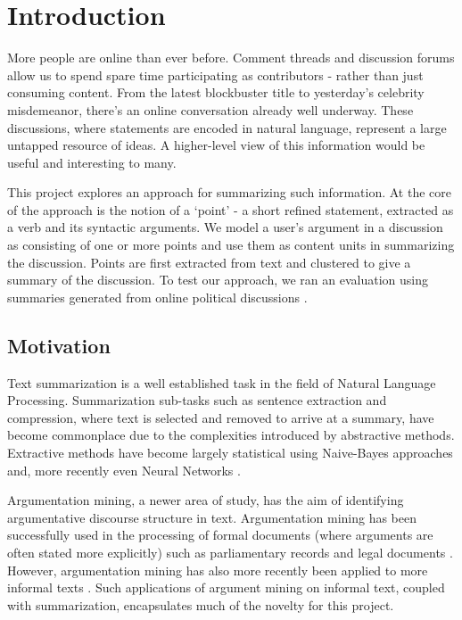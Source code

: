 \chapter{Introduction\label{chap:introduction}}
  More people are online than ever before. Comment threads and discussion forums allow us to spend spare time participating as contributors - rather than just consuming content. From the latest blockbuster title to yesterday's celebrity misdemeanor, there's an online conversation already well underway. These discussions, where statements are encoded in natural language, represent a large untapped resource of ideas. A higher-level view of this information would be useful and interesting to many.

  This project explores an approach for summarizing such information. At the core of the approach is the notion of a `point' - a short refined statement, extracted as a verb and its syntactic arguments. We model a user's argument in a discussion as consisting of one or more points and use them as content units in summarizing the discussion. Points are first extracted from text and clustered to give a summary of the discussion. To test our approach, we ran an evaluation using summaries generated from online political discussions \cite{walker2012corpus}.

  \section{Motivation}
    Text summarization is a well established task in the field of Natural Language Processing. Summarization sub-tasks such as sentence extraction and compression, where text is selected and removed to arrive at a summary, have become commonplace due to the complexities introduced by abstractive methods. Extractive methods have become largely statistical using Naive-Bayes \cite{kupiec1995trainable} approaches and, more recently even Neural Networks \cite{svore2007enhancing}.

    Argumentation mining, a newer area of study, has the aim of identifying argumentative discourse structure in text. Argumentation mining has been successfully used in the processing of formal documents (where arguments are often stated more explicitly) such as parliamentary records \cite{palau2009argumentation} and legal documents \cite{montemagni2010semantic}. However, argumentation mining has also more recently been applied to more informal texts \cite{park2015conditional}. Such applications of argument mining on informal text, coupled with summarization, encapsulates much of the novelty for this project.

